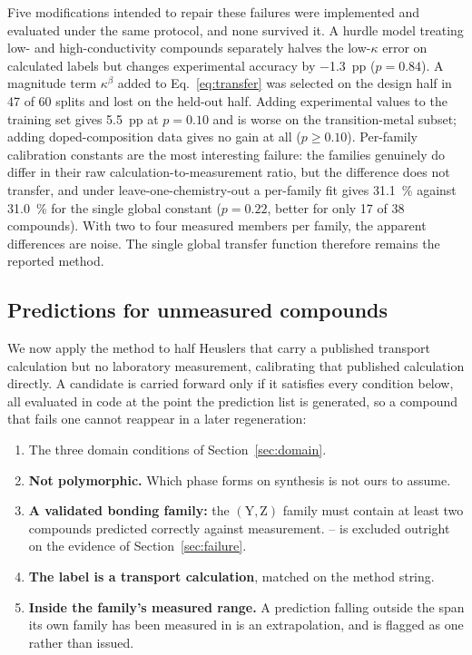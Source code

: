 Five modifications intended to repair these failures were implemented and evaluated under the same
protocol, and none survived it. A hurdle model treating low- and high-conductivity compounds
separately halves the low-$\kappa$ error on calculated labels but changes experimental accuracy by
\SI{-1.3}{pp} ($p=\num{0.84}$). A magnitude term $\kappa^{\beta}$ added to Eq.~\eqref{eq:transfer}
was selected on the design half in 47 of 60 splits and lost on the held-out half. Adding
experimental values to the training set gives \SI{+5.5}{pp} at $p=\num{0.10}$ and is worse on the
transition-metal subset; adding doped-composition data gives no gain at all ($p\geq\num{0.10}$).
Per-family calibration constants are the most interesting failure: the families genuinely do differ
in their raw calculation-to-measurement ratio, but the difference does not transfer, and under
leave-one-chemistry-out a per-family fit gives \SI{31.1}{\percent} against \SI{31.0}{\percent} for
the single global constant ($p=\num{0.22}$, better for only 17 of \num{38} compounds). With two to
four measured members per family, the apparent differences are noise. The single global transfer
function therefore remains the reported method.

\subsection{Predictions for unmeasured compounds}
\label{sec:predictions}
\label{sec:screening}
\label{sec:issued}

We now apply the method to half Heuslers that carry a published transport calculation but no
laboratory measurement, calibrating that published calculation directly. A candidate is carried
forward only if it satisfies every condition below, all evaluated in code at the point the
prediction list is generated, so a compound that fails one cannot reappear in a later regeneration:

\begin{enumerate}
  \item The three domain conditions of Section~\ref{sec:domain}.
  \item \textbf{Not polymorphic.} Which phase forms on synthesis is not ours to assume.
  \item \label{itm:family} \textbf{A validated bonding family:} the $(\mathrm{Y},\mathrm{Z})$
        family must contain at least two compounds predicted correctly against measurement.
        -- is excluded outright on the evidence of Section~\ref{sec:failure}.
  \item \textbf{The label is a transport calculation}, matched on the method string.
  \item \textbf{Inside the family's measured range.} A prediction falling outside the span its own
        family has been measured in is an extrapolation, and is flagged as one rather than issued.
\end{enumerate}


